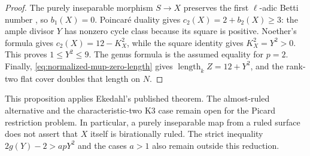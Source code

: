 \begin{proof}
The purely inseparable morphism $S\to X$ preserves the first
$\ell$-adic Betti number
\cite[Lemma~0.1.5, p.~103]{EkedahlCanonical}, so $b_1(X)=0$.
Poincar\'e duality gives $c_2(X)=2+b_2(X)\geq3$: the ample
divisor $Y$ has nonzero cycle class because its square is positive.
Noether's formula gives $c_2(X)=12-K_X^2$, while the square
identity gives $K_X^2=Y^2>0$. This proves $1\leq Y^2\leq9$.
The genus formula is the assumed equality for $p=2$.
Finally, \eqref{eq:normalized-mup-zero-length} gives
$\operatorname{length}_k Z=12+Y^2$, and the rank-two flat cover
doubles that length on $N$.
\end{proof}

This proposition applies Ekedahl's published theorem. The
almost-ruled alternative and the characteristic-two K3 case
remain open for the Picard restriction problem. In particular,
a purely inseparable map from a ruled surface does not assert
that $X$ itself is birationally ruled. The strict inequality
$2g(Y)-2>apY^2$ and the cases $a>1$ also remain outside this
reduction.
